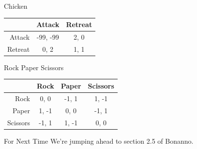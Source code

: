 \documentclass[
  14pt,
  letterpaper,
  ignorenonframetext,
  aspectratio=169,
  handout]{beamer}
\begin{document}
\begin{frame}[fragile]{Chicken}
\protect\hypertarget{chicken}{}
\begin{table}[!h]
\centering
\begin{tabular}[t]{>{}r|cc}
\toprule
 & Attack & Retreat\\
\midrule
Attack & -99, -99 & 2, 0\\
Retreat & 0, 2 & 1, 1\\
\bottomrule
\end{tabular}
\end{table}
\end{frame}

\begin{frame}[fragile]{Rock Paper Scissors}
\protect\hypertarget{rock-paper-scissors}{}
\begin{table}[!h]
\centering
\begin{tabular}[t]{>{}r|ccc}
\toprule
 & Rock & Paper & Scissors\\
\midrule
Rock & 0, 0 & -1, 1 & 1, -1\\
Paper & 1, -1 & 0, 0 & -1, 1\\
Scissors & -1, 1 & 1, -1 & 0, 0\\
\bottomrule
\end{tabular}
\end{table}
\end{frame}

\begin{frame}{For Next Time}
\protect\hypertarget{for-next-time}{}
We're jumping ahead to section 2.5 of Bonanno.
\end{frame}
\end{document}
